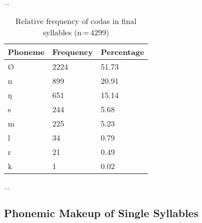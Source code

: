 ...

\begin{table}[hp]\centering
\caption[Relative frequency of codas in final syllables]{Relative frequency of codas in final syllables (n\,=\,4299)}
\begin{tabu} to 0.5\textwidth{X X[c] X[c]}
\tableheaderfont\toprule
Phoneme
	& Frequency
	& Percentage
	\\
	
\toprule

Ø	&	2224	&	51.73\pct\\

\midrule

n	&	899	&	20.91\pct\\
ŋ	&	651	&	15.14\pct\\
s	&	244	&	5.68\pct\\
m	&	225	&	5.23\pct\\
l	&	34	&	0.79\pct\\
r	&	21	&	0.49\pct\\
k	&	1	&	0.02\pct\\

\bottomrule
\end{tabu}
\label{tab:fincod}
\end{table}

...

\subsection{Phonemic Makeup of Single Syllables}

